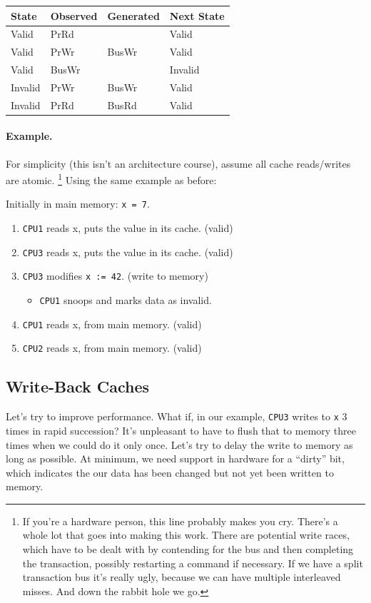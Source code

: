 \documentclass[a4paper]{report}
\begin{document}
  \begin{center}
    \begin{tabular}{l|l|l|l}
      {\bf State} & {\bf Observed} & {\bf Generated} & {\bf Next State}\\ \hline
      Valid   & PrRd  &       & Valid\\
      Valid   & PrWr  & BusWr & Valid\\
      Valid   & BusWr &       & Invalid\\
      Invalid & PrWr  & BusWr & Valid\\
      Invalid & PrRd  & BusRd & Valid\\
    \end{tabular}
  \end{center}

\paragraph{Example.} For simplicity (this isn't an architecture course), assume all cache
      reads/writes are atomic. \footnote{If you're a hardware person, this line probably makes you cry. There's a whole lot that goes into making this work. There are potential write races, which have to be dealt with by contending for the bus and then completing the transaction, possibly restarting a command if necessary. If we have a split transaction bus it's really ugly, because we can have multiple interleaved misses. And down the rabbit hole we go.} Using the same example as before:

Initially in main memory: {\tt x = 7}.

  \begin{enumerate}
    \item {\tt CPU1} reads x, puts the value in its cache. {(valid)}
    \item {\tt CPU3} reads x, puts the value in its cache. {(valid)}
    \item {\tt CPU3} modifies {\tt x := 42}. {(write to memory)}
      \begin{itemize}
        \item {{\tt CPU1} snoops and marks data as invalid.}
      \end{itemize}
    \item {\tt CPU1} reads x, {from main memory. (valid)}
    \item {\tt CPU2} reads x, {from main memory. (valid)}
  \end{enumerate}

\subsection*{Write-Back Caches}
Let's try to improve performance. What if, in our example, {\tt CPU3} writes to {\tt x} 3 times in rapid succession? It's unpleasant to have to flush that to memory three times when we could do it only once. Let's try to delay the write to memory as long as possible. At minimum, we need support in hardware for a ``dirty'' bit, which indicates the our data has been changed but not yet been written to memory.
\end{document}
